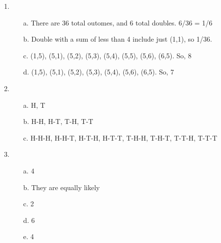\begin{enumerate}
    \item
        \begin{itemize}
            \item[a.]   There are 36 total outomes, and 6 total doubles. 6/36 = 1/6
            \item[b.]   Double with a sum of less than 4 include just (1,1), so 1/36.
            \item[c.]   (1,5), (5,1), (5,2), (5,3), (5,4), (5,5), (5,6), (6,5).
                        So, 8
            \item[d.]   (1,5), (5,1), (5,2), (5,3), (5,4), (5,6), (6,5).
                        So, 7
        \end{itemize}
        
    \item
        \begin{itemize}
            \item[a.]   H, T
            \item[b.]   H-H, H-T, T-H, T-T
            \item[c.]   H-H-H, H-H-T, H-T-H, H-T-T, T-H-H, T-H-T, T-T-H, T-T-T
        \end{itemize}
        
    \item
        \begin{itemize}
            \item[a.]   4
            \item[b.]   They are equally likely
            \item[c.]   2
            \item[d.]   6
            \item[e.]   4
        \end{itemize}
        
        
\end{enumerate}
    


